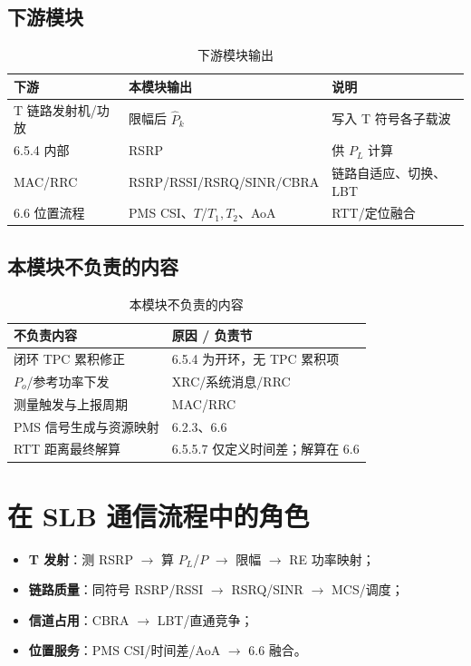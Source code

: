\documentclass[11pt,a4paper]{ctexart}
\begin{document}
\subsection{下游模块}

\begin{longtable}{L{4.2cm}L{4.5cm}L{5.5cm}}
\caption{下游模块输出\label{tab:6545-down}} \\
\toprule
\textbf{下游} & \textbf{本模块输出} & \textbf{说明} \\
\midrule
T 链路发射机/功放 & 限幅后 $\hat{P}_k$ & 写入 T 符号各子载波 \\
6.5.4 内部 & RSRP & 供 $P_L$ 计算 \\
MAC/RRC & RSRP/RSSI/RSRQ/SINR/CBRA & 链路自适应、切换、LBT \\
6.6 位置流程 & PMS CSI、$T$/$T_1,T_2$、AoA & RTT/定位融合 \\
\bottomrule
\end{longtable}

\subsection{本模块不负责的内容}

\begin{longtable}{L{5.5cm}L{8.5cm}}
\caption{本模块不负责的内容\label{tab:6545-out}} \\
\toprule
\textbf{不负责内容} & \textbf{原因 / 负责节} \\
\midrule
闭环 TPC 累积修正 & 6.5.4 为开环，无 TPC 累积项 \\
$P_o$/参考功率下发 & XRC/系统消息/RRC \\
测量触发与上报周期 & MAC/RRC \\
PMS 信号生成与资源映射 & 6.2.3、6.6 \\
RTT 距离最终解算 & 6.5.5.7 仅定义时间差；解算在 6.6 \\
\bottomrule
\end{longtable}

\section{在 SLB 通信流程中的角色}

\begin{itemize}[nosep]
  \item \textbf{T 发射}：测 RSRP $\rightarrow$ 算 $P_L$/$P$ $\rightarrow$ 限幅 $\rightarrow$ RE 功率映射；
  \item \textbf{链路质量}：同符号 RSRP/RSSI $\rightarrow$ RSRQ/SINR $\rightarrow$ MCS/调度；
  \item \textbf{信道占用}：CBRA $\rightarrow$ LBT/直通竞争；
  \item \textbf{位置服务}：PMS CSI/时间差/AoA $\rightarrow$ 6.6 融合。
\end{itemize}
\end{document}
